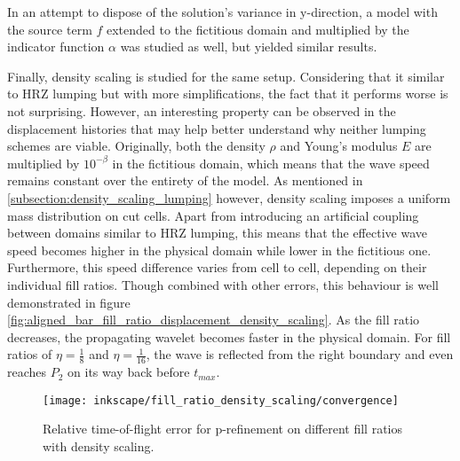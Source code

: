 In an attempt to dispose of the solution's variance in y-direction, a model with the source term $f$ extended to the fictitious domain and multiplied by the indicator function $\alpha$ was studied as well, but yielded similar results.

Finally, density scaling is studied for the same setup. Considering that it similar to HRZ lumping but with more simplifications, the fact that it performs worse is not surprising. However, an interesting property can be observed in the displacement histories that may help better understand why neither lumping schemes are viable. Originally, both the density $\rho$ and Young's modulus $E$ are multiplied by $10^{-\beta}$ in the fictitious domain, which means that the wave speed remains constant over the entirety of the model. As mentioned in \ref{subsection:density_scaling_lumping} however, density scaling imposes a uniform mass distribution on cut cells. Apart from introducing an artificial coupling between domains similar to HRZ lumping, this means that the effective wave speed becomes higher in the physical domain while lower in the fictitious one. Furthermore, this speed difference varies from cell to cell, depending on their individual fill ratios. Though combined with other errors, this behaviour is well demonstrated in figure \ref{fig:aligned_bar_fill_ratio_displacement_density_scaling}. As the fill ratio decreases, the propagating wavelet becomes faster in the physical domain. For fill ratios of $\eta=\frac{1}{8}$ and $\eta=\frac{1}{16}$, the wave is reflected from the right boundary and even reaches $P_2$ on its way back before $t_{max}$.

\begin{figure}[!h]
	\centering
	\texttt{[image: inkscape/fill\_ratio\_density\_scaling/convergence]}
	\caption{Relative time-of-flight error for p-refinement on different fill ratios with density scaling.}
	\label{fig:aligned_bar_fill_ratio_convergence_density_scaling}
\end{figure}

